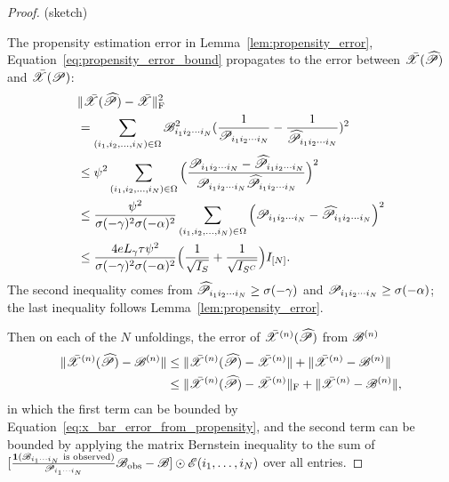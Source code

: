 \documentclass{article}
\newcommand{\T}[2][]{#1\mathscr{\MakeUppercase{#2}}}
\newcommand{\norm}[1]{\Vert #1 \Vert}
\newcommand{\fnorm}[1]{\norm{#1}_{\mathrm{F}}}
\def\Ph{\widehat P}
\theoremstyle{plain}
\begin{document}
\begin{proof}(sketch)
	
	The propensity estimation error in Lemma~\ref{lem:propensity_error}, Equation~\ref{eq:propensity_error_bound} propagates to the error between $\bar{\T{X}}(\widehat{\T{P}})$ and $\bar{\T{X}}(\T{P})$: 
	\begin{equation}
		\label{eq:x_bar_error_from_propensity}
		\begin{aligned}
			& \fnorm{\bar{\T{X}}(\T{\Ph}) - \bar{\T{X}}}^2 \\
			& = \sum_{({i_1, i_2, \dots, i_N}) \in \Omega} \T{B}_{i_1 i_2 \cdots i_N}^2 (\frac{1}{\T{P}_{i_1 i_2 \cdots i_N}} - \frac{1}{\T{\Ph}_{i_1 i_2 \cdots i_N}})^2 \\
			& \leq  \psi^2 \sum_{({i_1, i_2, \dots, i_N}) \in \Omega} \Big(\frac{\T{P}_{i_1 i_2 \cdots i_N} - \T{\Ph}_{i_1 i_2 \cdots i_N}}{\T{P}_{i_1 i_2 \cdots i_N} \T{\Ph}_{i_1 i_2 \cdots i_N}} \Big)^2 \\
			& \leq  \frac{\psi^2}{\sigma(-\gamma)^2 \sigma(-\alpha)^2} \sum_{({i_1, i_2, \dots, i_N}) \in \Omega} \Big(\T{P}_{i_1 i_2 \cdots i_N} - \T{\Ph}_{i_1 i_2 \cdots i_N} \Big)^2 \\
			& \leq \frac{4 e L_\gamma \tau \psi^2}{\sigma(-\gamma)^2 \sigma(-\alpha)^2} \Big(\frac{1}{\sqrt{I_S}}+\frac{1}{\sqrt{I_{S^C}}}\Big) I_{[N]}.
		\end{aligned}
	\end{equation}
	The second inequality comes from $ \T{\Ph}_{i_1 i_2 \cdots i_N} \geq \sigma(-\gamma)$ and $ \T{P}_{i_1 i_2 \cdots i_N} \geq \sigma(-\alpha)$; the last inequality follows Lemma~\ref{lem:propensity_error}.
	
	Then on each of the $N$ unfoldings, the error of $\bar{\T{X}}^{(n)}(\widehat{\T{P}})$ from $\T{B}^{(n)}$
	\begin{equation}
		\label{eq:general_sampling_estimator_error}
		\begin{aligned}
			\norm{\bar{\T{X}}^{(n)}(\T{\Ph}) - \T{B}^{(n)}} & \leq \norm{\bar{\T{X}}^{(n)}(\T{\Ph}) - \bar{\T{X}}^{(n)}} + \norm{\bar{\T{X}}^{(n)} - \T{B}^{(n)}} \\
			& \leq \fnorm{\bar{\T{X}}^{(n)}(\T{\Ph}) - \bar{\T{X}}^{(n)}} + \norm{\bar{\T{X}}^{(n)} - \T{B}^{(n)}},\\
		\end{aligned}
	\end{equation}
	in which the first term can be bounded by Equation~\ref{eq:x_bar_error_from_propensity}, and the second term can be bounded by applying the matrix Bernstein inequality \cite{tropp2015introduction} to the sum of $[\frac{\mathbf{1}(\T{B}_{i_1 \cdots i_N} \text{ is observed})}{\T{P}_{i_1 \cdots i_N}} \T{B}_\text{obs} - \T{B}] \odot \T{E}(i_1, \dots, i_N)$ over all entries.
	

\end{proof}
\end{document}
